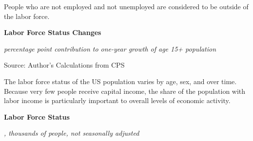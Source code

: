 \documentclass{report}
\makeatletter
\newcommand{\tbllink}[1]{\href{https://raw.githubusercontent.com/bdecon/US-chartbook/master/chartbook/data/#1}{\faTable}}
\newcommand*\short[1]{\expandafter\@gobbletwo\number\numexpr#1\relax}
\newcommand{\ctsbar}[5]{
		\addplot[ybar stacked, bar width=#5, draw opacity=0, fill=#1] 
			table [x=#2, y=#3, col sep=comma]{#4};}
\newcommand{\dateaxisticks}{
		date coordinates in=x, axis line style={draw=none},
		xmax={2020-08-10},
		max space between ticks=40,	    
		xtick={{1990-01-01}, {1992-01-01}, {1994-01-01}, 
			{1996-01-01}, {1998-01-01}, {2000-01-01}, 
			{2002-01-01}, {2004-01-01}, {2006-01-01},
			{2008-01-01}, {2010-01-01}, {2012-01-01}, {2014-01-01},
		    {2016-01-01}, {2018-01-01}, {2020-01-01}},
		minor xtick={{1989-01-01}, {1991-01-01}, {1993-01-01},
			{1995-01-01}, {1997-01-01}, {1999-01-01}, 
			{2001-01-01}, {2003-01-01}, {2005-01-01}, {2007-01-01},
		    {2009-01-01}, {2011-01-01}, {2013-01-01}, {2015-01-01},
		    {2017-01-01}, {2019-01-01}},
		enlarge y limits={0.06}, enlarge x limits={0.01},
		}
\newcommand{\bbar}[2]{extra #1 ticks = {{#2}}, extra #1 tick labels = ,
		extra #1 tick style = {grid=major, grid style={thick, black!25}},}
\newcommand{\rbars}{
		\fill[color=black!10] (axis cs:{1990-07-01},\pgfkeysvalueof{/pgfplots/ymin}) rectangle 
			(axis cs:{1991-03-01}, \pgfkeysvalueof{/pgfplots/ymax});
		\fill[color=black!10] (axis cs:{2007-12-01},\pgfkeysvalueof{/pgfplots/ymin}) rectangle 
			(axis cs:{2009-07-01}, \pgfkeysvalueof{/pgfplots/ymax});
		\fill[color=black!10] (axis cs:{2001-03-01},\pgfkeysvalueof{/pgfplots/ymin}) rectangle 
			(axis cs:{2001-11-01}, \pgfkeysvalueof{/pgfplots/ymax});
		\fill[color=black!10] (axis cs:{2020-02-01},\pgfkeysvalueof{/pgfplots/ymin}) rectangle 
			(axis cs:{2020-09-01}, \pgfkeysvalueof{/pgfplots/ymax});}
\makeatother
\begin{document}
{{{{{{\begin{minipage}{0.76\textwidth}
People who are not employed and not unemployed are considered to be outside of the labor force.  

\vspace{5mm}

\normalsize \textbf{Labor Force Status Changes}

\footnotesize{\textit{percentage point contribution to one-year growth of age 15+ population}}

\hspace*{-2mm} 

\footnotesize{Source: Author's Calculations from CPS} \hfill \tbllink{cps_lfs2.csv}

\end{minipage}

\newpage

\begin{minipage}{0.76\textwidth}

\small The labor force status of the US population varies by age, sex, and over time. Because very few people receive capital income, the share of the population with labor income is particularly important to overall levels of economic activity. 

\vspace{3mm}

\noindent \normalsize \textbf{Labor Force Status}

\footnotesize{\textit{\unskip, thousands of people, not seasonally adjusted}}

\noindent {} \setlength{\tabcolsep}{3.0pt} \color{black!90}
		{\renewcommand{\arraystretch}{1.52}
		 \begin{tabular}{p{27.8mm} R{11.2mm} R{10.4mm} R{10.4mm} R{10.2mm} 
		 				 R{10.6mm} R{10.4mm} R{10.4mm}}
			 \hline
		\end{tabular}}
		

\end{minipage}}}}}}}
\end{document}
